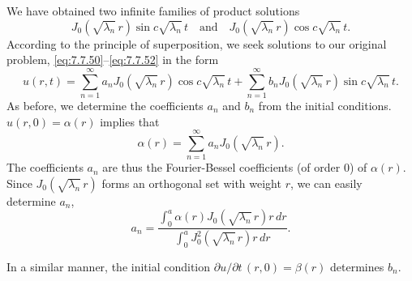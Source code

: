 We have obtained two infinite families of product solutions
\[
J_0\left(\sqrt{\lambda_n}\,r\right)\sin c\sqrt{\lambda_n}\,t \quad\text{and}\quad J_0\left(\sqrt{\lambda_n}\,r\right)\cos c\sqrt{\lambda_n}\,t.
\]
According to the principle of superposition, we seek solutions to our original problem, \eqref{eq:7.7.50}--\eqref{eq:7.7.52} in the form
\begin{equation}
\boxed{u(r,t) = \sum_{n=1}^{\infty} a_n J_0\left(\sqrt{\lambda_n}\,r\right)\cos c\sqrt{\lambda_n}\,t + \sum_{n=1}^{\infty} b_n J_0\left(\sqrt{\lambda_n}\,r\right)\sin c\sqrt{\lambda_n}\,t.}
\label{eq:7.7.64}
\end{equation}
As before, we determine the coefficients $a_n$ and $b_n$ from the initial conditions.  $u(r,0) = \alpha(r)$ implies that
\begin{equation}
\alpha(r) = \sum_{n=1}^{\infty} a_n J_0\left(\sqrt{\lambda_n}\,r\right).
\label{eq:7.7.65}
\end{equation}
The coefficients $a_n$ are thus the Fourier-Bessel coefficients (of order 0) of $\alpha(r)$.  Since $J_0\left(\sqrt{\lambda_n}\,r\right)$ forms an orthogonal set with weight $r$, we can easily determine $a_n$,
\begin{equation}
\boxed{a_n = \frac{\int_0^a \alpha(r)J_0\left(\sqrt{\lambda_n}\,r\right)r\,dr}{\int_0^a J_0^2\left(\sqrt{\lambda_n}\,r\right)r\,dr}.}
\label{eq:7.7.66}
\end{equation}

In a similar manner, the initial condition $\partial u/\partial t\,(r,0) = \beta(r)$ determines $b_n$.

